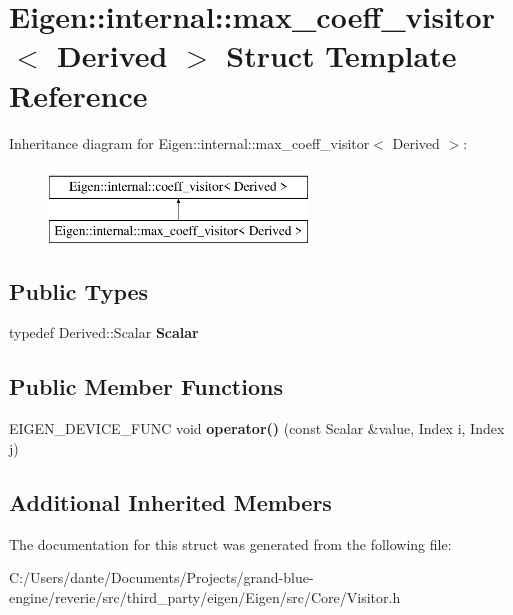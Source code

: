 \hypertarget{struct_eigen_1_1internal_1_1max__coeff__visitor}{}\section{Eigen\+::internal\+::max\+\_\+coeff\+\_\+visitor$<$ Derived $>$ Struct Template Reference}
\label{struct_eigen_1_1internal_1_1max__coeff__visitor}
Inheritance diagram for Eigen\+::internal\+::max\+\_\+coeff\+\_\+visitor$<$ Derived $>$\+:\begin{figure}[H]
\begin{center}
\leavevmode
\includegraphics[height=2.000000cm]{struct_eigen_1_1internal_1_1max__coeff__visitor}
\end{center}
\end{figure}
\subsection*{Public Types}
\begin{DoxyCompactItemize}
\item 
\mbox{\label{struct_eigen_1_1internal_1_1max__coeff__visitor_af0f55c945c93a4c9a8423c9c4d9b24cb}} 
typedef Derived\+::\+Scalar {\bfseries Scalar}
\end{DoxyCompactItemize}
\subsection*{Public Member Functions}
\begin{DoxyCompactItemize}
\item 
\mbox{\label{struct_eigen_1_1internal_1_1max__coeff__visitor_ad124641f1e34ea2159567e070457f751}} 
E\+I\+G\+E\+N\+\_\+\+D\+E\+V\+I\+C\+E\+\_\+\+F\+U\+NC void {\bfseries operator()} (const Scalar \&value, Index i, Index j)
\end{DoxyCompactItemize}
\subsection*{Additional Inherited Members}


The documentation for this struct was generated from the following file\+:\begin{DoxyCompactItemize}
\item 
C\+:/\+Users/dante/\+Documents/\+Projects/grand-\/blue-\/engine/reverie/src/third\+\_\+party/eigen/\+Eigen/src/\+Core/Visitor.\+h\end{DoxyCompactItemize}

